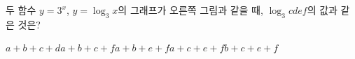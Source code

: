 \noindent\begin{minipage}[t]{0.58\linewidth}\vspace{0pt}\raggedright 두 함수 $y=3^x$, $y=\log_3 x$의 그래프가 오른쪽 그림과 같을 때, $\log_3 cdef$의 값과 같은 것은? \end{minipage}\hfill\begin{minipage}[t]{0.4\linewidth}\vspace{0pt}\centering \resizebox{\ifdim\width>\linewidth\linewidth\else\width\fi}{!}{}\end{minipage}\par
\begin{choicesv}{$a+b+c+d$}{$a+b+c+f$}{$a+b+e+f$}{$a+c+e+f$}{$b+c+e+f$}\end{choicesv}

